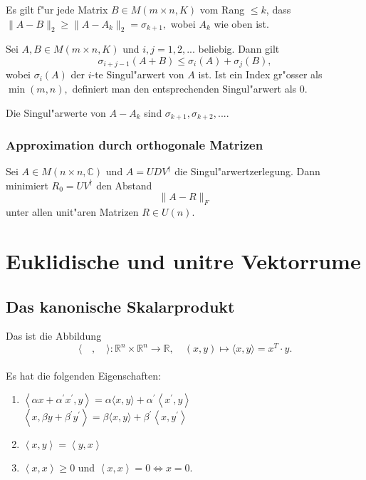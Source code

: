 \documentclass[9pt, a4paper, twocolumn, landscape]{article}
\begin{document}
\begin{remark}
Es gilt f"ur jede Matrix $B \in M( m \times n, K)$ vom Rang $\leq k$, dass \\
$
\|A - B\|_2 \geq \|A - A_k \|_2 = \sigma_{k+1},
$
wobei $A_k$ wie oben ist.
\end{remark}

\begin{corollary}
Sei $A, B \in M(m \times n, K)$ und $i, j = 1, 2, ...$ beliebig. Dann gilt
$$
\sigma_{i+j-1} (A+B) \leq \sigma_i(A) + \sigma_j(B), 
$$
wobei $ \sigma_i(A)$ der $i$-te Singul"arwert von $A$ ist. Ist ein Index gr"osser als $\min(m, n),$ definiert man den entsprechenden Singul"arwert als $0$.
\end{corollary}

\begin{remark}
Die Singul"arwerte von $A - A_k$ sind $\sigma_{k+1}, \sigma_{k+2}, ... .$
\end{remark}

\subsubsection{Approximation durch orthogonale Matrizen}
\begin{theorem}
Sei $A \in M(n \times n, \mathbb{C})$ und $A = UDV^\dagger$ die Singul"arwertzerlegung. Dann minimiert $R_0 = UV^\dagger$ den Abstand 
$$
\|A - R\|_F
$$
unter allen unit"aren Matrizen $R \in U(n)$.
\end{theorem}

\section{Euklidische und unit\aee re Vektorr\aee ume}

\subsection{Das kanonische Skalarprodukt}
\begin{definition}
Das  ist die Abbildung $$\langle\quad, \quad\rangle: \mathbb{R}^{n} \times \mathbb{R}^{n} \rightarrow \mathbb{R}, \quad(x, y) \mapsto\langle x, y\rangle  =  x^T \cdot y.$$
\\Es hat die folgenden Eigenschaften:
\begin{enumerate}
\item {} $\left\langle \alpha x+ \alpha^{\prime} x^{\prime}, y\right\rangle=\alpha \langle x, y\rangle+ \alpha^{\prime}\left\langle x^{\prime}, y\right\rangle $
\\$\left\langle x, \beta y+ \beta^{\prime} y^{\prime}\right\rangle=\beta \langle x, y\rangle+ \beta^{\prime}\left\langle x, y^{\prime}\right\rangle $
\item {} $\left\langle x, y \right\rangle = \left\langle y, x \right\rangle$
\item {} $\left\langle x, x \right\rangle \geq 0$ und $\left\langle x, x \right\rangle = 0 \Leftrightarrow x = 0$.
\end{enumerate}
\end{definition}
\end{document}
